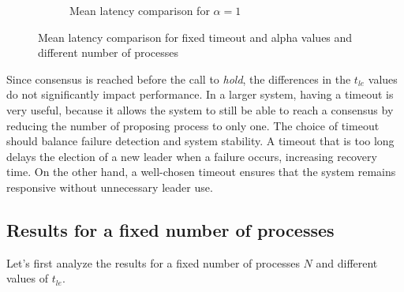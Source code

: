 \documentclass{article}
\begin{document}
\begin{figure}[h!]
\begin{subfigure}{.55\textwidth}
        \vspace{1cm}
        \caption{Mean latency comparison for $\alpha = 1$}
    \end{subfigure}
    \caption{Mean latency comparison for fixed timeout and alpha values and different number of processes}
\end{figure}
Since consensus is reached before the call to \textit{hold}, the differences in the \( t_{le} \) values do not significantly impact performance. In a larger system, having a timeout is very useful, because it allows the system to still be able to reach a consensus by reducing the number of proposing process to only one.
The choice of timeout should balance failure detection and system stability. A timeout that is too long delays the election of a new leader when a failure occurs, increasing recovery time. On the other hand, a well-chosen timeout ensures that the system remains responsive without unnecessary leader use.

\newpage

\subsection{Results for a fixed number of processes}
Let's first analyze the results for a fixed number of processes $N$ and different values of $t_{le}$.
\end{document}
